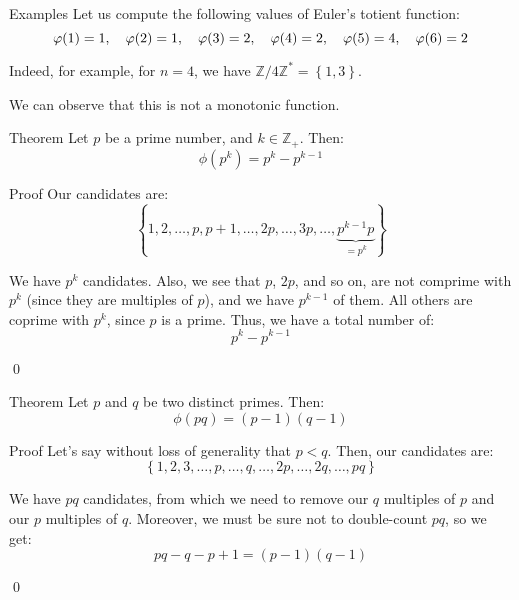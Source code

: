 \documentclass[a4paper]{article}
\begin{document}
\begin{parag}{Examples}
    Let us compute the following values of Euler's totient function: 
    \[\phi\left(1\right) = 1, \mathspace \phi\left(2\right) = 1, \mathspace \phi\left(3\right) = 2, \mathspace \phi\left(4\right) = 2, \mathspace \phi\left(5\right) = 4, \mathspace \phi\left(6\right) = 2\]
    
    Indeed, for example, for $n = 4$, we have $\mathbb{Z} / 4\mathbb{Z}^* = \left\{1, 3\right\}$.

    We can observe that this is not a monotonic function.
\end{parag}

\begin{parag}{Theorem}
    Let $p$ be a prime number, and $k \in \mathbb{Z}_+$. Then: 
    \[\phi\left(p^k\right) = p^k - p^{k-1}\]
    
    \begin{subparag}{Proof}
        Our candidates are: 
        \[\left\{1, 2, \ldots, p, p+1, \ldots, 2p, \ldots, 3p, \ldots, \underbrace{p^{k-1} p}_{= p^k}\right\}\]
        
        We have $p^k$ candidates. Also, we see that $p$, $2p$, and so on, are not comprime with $p^k$ (since they are multiples of $p$), and we have $p^{k-1}$ of them. All others are coprime with $p^k$, since $p$ is a prime. Thus, we have a total number of: 
        \[p^k - p^{k-1}\]
        
        \qed
    \end{subparag}
\end{parag}

\begin{parag}{Theorem}
    Let $p$ and $q$ be two distinct primes. Then: 
    \[\phi\left(pq\right) = \left(p-1\right)\left(q -1\right)\]
    
    \begin{subparag}{Proof}
        Let's say without loss of generality that $p < q$. Then, our candidates are: 
        \[\left\{1, 2, 3, \ldots, p, \ldots, q, \ldots, 2p, \ldots, 2q, \ldots, pq\right\}\]
        
        We have $pq$ candidates, from which we need to remove our $q$ multiples of $p$ and our $p$ multiples of $q$. Moreover, we must be sure not to double-count $pq$, so we get: 
        \[pq - q - p + 1 = \left(p-1\right)\left(q - 1\right)\]
        
        \qed
    \end{subparag}
\end{parag}
\end{document}
